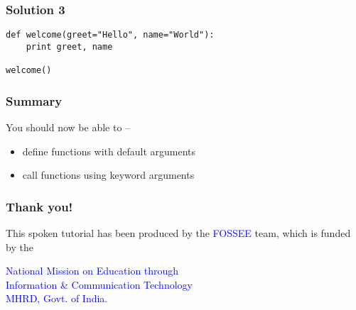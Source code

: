\documentclass[presentation]{beamer}
\begin{document}
\begin{frame}[fragile]
\frametitle{Solution 3}
\label{sec-7}

\lstset{language=Python}
\begin{lstlisting}
def welcome(greet="Hello", name="World"):
    print greet, name

welcome()
\end{lstlisting}
\end{frame}
\begin{frame}
\frametitle{Summary}
\label{sec-8}

  You should now be able to --
\begin{itemize}
\item define functions with default arguments
\item call functions using keyword arguments
\end{itemize}
\end{frame}
\begin{frame}
\frametitle{Thank you!}
\label{sec-9}

  \begin{block}{}
  \begin{center}
  This spoken tutorial has been produced by the
  \textcolor{blue}{FOSSEE} team, which is funded by the 
  \end{center}
  \begin{center}
    \textcolor{blue}{National Mission on Education through \\
      Information \& Communication Technology \\ 
      MHRD, Govt. of India}.
  \end{center}  
  \end{block}
\end{frame}
\end{document}
